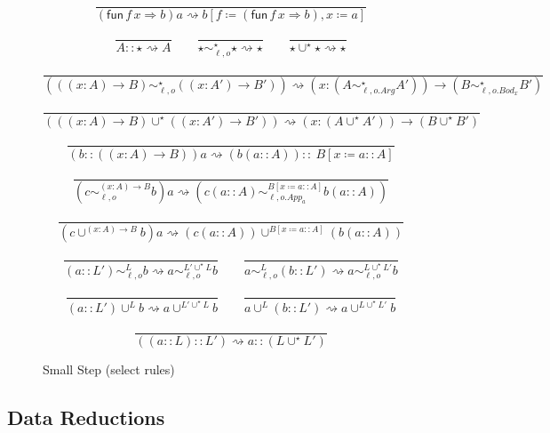\begin{figure}
\[
\frac{\ }{\left(\mathsf{fun}\,f\,x\Rightarrow b\right)a\rightsquigarrow b\left[f\coloneqq\left(\mathsf{fun}\,f\,x\Rightarrow b\right),x\coloneqq a\right]}
\]

\[
\frac{\ }{A::\star\rightsquigarrow A}
\quad \quad
\frac{\ }{\star\sim_{\ell,o}^{\star}\star\rightsquigarrow\star}
\quad \quad
\frac{\ }{\star\cup^{\star}\star\rightsquigarrow\star}
\]

\[
\frac{\ }{\left(\left(\left(x:A\right)\rightarrow B\right)\sim_{\ell,o}^{\star}\left(\left(x:A'\right)\rightarrow B'\right)\right)\rightsquigarrow\left(x:\left(A\sim_{\ell,o.Arg}^{\star}A'\right)\right)\rightarrow\left(B\sim_{\ell,o.Bod_{x}}^{\star}B'\right)}
\]

\[
\frac{\ }{\left(\left(\left(x:A\right)\rightarrow B\right)\cup^{\star}\left(\left(x:A'\right)\rightarrow B'\right)\right)\rightsquigarrow\left(x:\left(A\cup^{\star}A'\right)\right)\rightarrow\left(B\cup^{\star}B'\right)}
\]

\[
\frac{\ }{\left(b::\left(\left(x:A\right)\rightarrow B\right)\right)a\rightsquigarrow\left(b\left(a::A\right)\right)::\ B\left[x\coloneqq a::A\right]}
\]

\[
\frac{\ }{\left(c\sim_{\ell,o}^{\left(x:A\right)\rightarrow B}b\right)a\rightsquigarrow\left(c\left(a::A\right)\sim_{\ell,o.App_{a}}^{B\left[x\coloneqq a::A\right]}b\left(a::A\right)\right)}
\]

\[
\frac{\ }{\left(c\cup^{\left(x:A\right)\rightarrow B}b\right)a\rightsquigarrow\left(c\left(a::A\right)\right)\cup^{B\left[x\coloneqq a::A\right]}\left(b\left(a::A\right)\right)}
\]

\[
\frac{\ }{\left(a::L'\right)\sim_{\ell,o}^{L}b\rightsquigarrow a\sim_{\ell,o}^{L'\cup^{\star}L}b}
\quad \quad
\frac{\ }{a\sim_{\ell,o}^{L}\left(b::L'\right)\rightsquigarrow a\sim_{\ell,o}^{L\cup^{\star}L'}b}
\]

\[
\frac{\ }{\left(a::L'\right)\cup^{L}b\rightsquigarrow a\cup^{L'\cup^{\star}L}b}
\quad \quad
\frac{\ }{a\cup^{L}\left(b::L'\right)\rightsquigarrow a\cup^{L\cup^{\star}L'}b}
\]

\[
\frac{\ }{\left(\left(a::L\right)::L'\right)\rightsquigarrow a::\left(L\cup^{\star}L'\right)}
\]
\caption{\CLang{} Small Step (select rules)}
\label{fig:cast-data-step}
\end{figure}

\subsection{Data Reductions}

